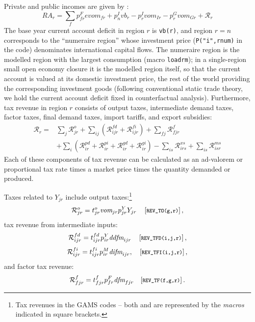 Private and public incomes are given by :
\begin{equation}
\textit{RA}_r = \sum_f p^F_{fr} \textit{evom}_{fr} + p^I_n
\textit{vb}_r -  p^I_{r} \textit{vom}_{Ir} - p^G_{r}
\textit{vom}_{Gr}  + \mathcal{R}_r
\end{equation}
The base year current account deficit in region $r$ is \texttt{vb(r)}, and region $r=n$ corresponds to the ``numeraire region'' whose investment price (\texttt{P("i",rnum)} in the code) denominates international capital flows.
The numeraire region is the modelled region with the largest consumption (macro \texttt{loadrm}); in a single-region small open economy closure it is the modelled region itself, so that the current account is valued at its domestic investment price, the rest of the world providing the corresponding investment goods (following conventional static trade theory, we hold the current account deficit fixed in counterfactual analysis).
Furthermore, tax revenue in region $r$ consists of output taxes, intermediate demand taxes, factor taxes, final demand taxes, import tariffs, and export subsidies:
\begin{equation}
\begin{array}{ll}
\mathcal{R}_r = & \sum_j \mathcal{R}^o_{jr}
                 + \sum_{ij} \left( \mathcal{R}^{fd}_{ijr} +
                 \mathcal{R}^{fi}_{ijr} \right)
                 + \sum_{fj} \mathcal{R}^f_{fjr} \\
                &+ \sum_{i}  \left( \mathcal{R}^{pd}_{ir} +
                 \mathcal{R}^{pi}_{ir} + \mathcal{R}^{gd}_{ir} +
                 \mathcal{R}^{gi}_{ir}  \right)
                 - \sum_{is} \mathcal{R}^{xs}_{irs}
                 + \sum_{is} \mathcal{R}^{ms}_{isr}
\end{array}
\end{equation}
Each of these components of tax revenue can be calculated as an ad-valorem or proportional tax rate times a market price times the quantity demanded or produced.

Taxes related to $Y_{jr}$ include output taxes:\footnote{Tax revenues in the GAMS codes -- both \MCP and \MGE are represented by the \textit{macros} indicated in square brackets.}
$$\mathcal{R}^o_{jr} =  t^o_{jr} \textit{vom}_{jr} p^Y_{jr}
Y_{jr}\, \quad [\footnotesize{\texttt{REV\_TO(g,r)}}]\,,$$ tax revenue from intermediate inputs:
$$\mathcal{R}^{fd}_{ijr} =  t^{fd}_{ijr} p^Y_{ir}
\textit{ddfm}_{ijr}\, \quad [\footnotesize{\texttt{REV\_TFD(i,j,r)}}]\,,$$
$$\mathcal{R}^{fi}_{ijr} = t^{fi}_{ijr} p^M_{ir}
\textit{difm}_{ijr}, \quad [\footnotesize{\texttt{REV\_TFI(i,j,r)}}]\,,$$ and factor tax revenue:
$$\mathcal{R}^f_{fjr} = t^{f}_{fjr} p^F_{fr} \textit{dfm}_{fjr} \quad
[\footnotesize{\texttt{REV\_TF(f,g,r)}}]\,.$$


